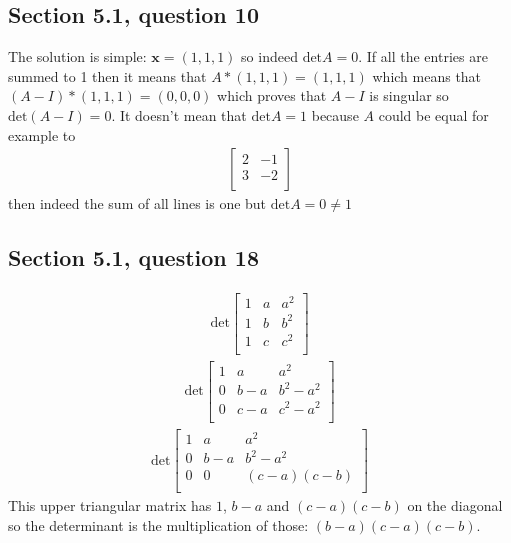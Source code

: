 \documentclass[a4paper,11pt]{article}
\newcommand{\mybf}[1]{\boldsymbol{#1}}
\begin{document}
\subsection*{Section 5.1, question 10}
The solution is simple: $\mybf{x}=(1,1,1)$ so indeed $\text{det}A=0$. If all the entries are summed to 1 then it means that $A*(1,1,1)=(1,1,1)$ which means that $(A-I)*(1,1,1)=(0,0,0)$ which proves that $A-I$ is singular so $\text{det}(A-I)=0$. It doesn't mean that $\text{det}A=1$ because $A$ could be equal for example to 
\begin{align*}
\begin{bmatrix}
2 & -1 \\
3 & -2 \\
\end{bmatrix}
\end{align*}
then indeed the sum of all lines is one but $\text{det}A=0\ne1$
\subsection*{Section 5.1, question 18}
\begin{align*}
\text{det}
\begin{bmatrix}
1 & a & a^2 \\
1 & b & b^2 \\
1 & c & c^2 \\
\end{bmatrix}
\end{align*}
\begin{align*}
\text{det}
\begin{bmatrix}
1 & a & a^2 \\
0 & b-a & b^2-a^2 \\
0 & c-a & c^2-a^2 \\
\end{bmatrix}
\end{align*}
\begin{align*}
\text{det}
\begin{bmatrix}
1 & a & a^2 \\
0 & b-a & b^2-a^2 \\
0 & 0 & (c-a)(c-b) \\
\end{bmatrix}
\end{align*}
This upper triangular matrix has $1$, $b-a$ and $(c-a)(c-b)$ on the diagonal so the determinant is the multiplication of those: $(b-a)(c-a)(c-b)$.
\end{document}
